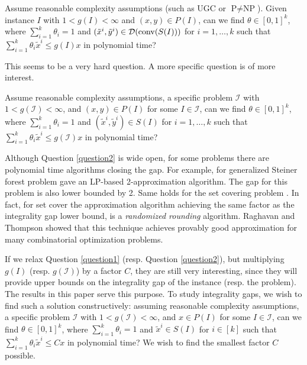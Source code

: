 \begin{question*}\label{question1}
	Assume reasonable complexity assumptions (such as UGC or $\textrm{P}\neq \textrm{NP}$). Given instance $I$ with $1<g(I)<\infty$ and $(x,y)\in P(I)$, can we find $\theta \in [0,1]^k$, where $\sum_{i=1}^{k}\theta_i =1$ and $(\tilde{x}^i,\tilde{y}^i)\in \operatorname{\mathcal{D}}(\operatorname{conv}(S(I)))$ for $i=1,\ldots,k$ such that $\sum_{i=1}^{k}\theta_i \tilde{x}^i\leq g(I)x$ in polynomial time?
\end{question*}

This seems to be a very hard question. A more specific question is of more interest.

\begin{question}\label{question2}
	Assume reasonable complexity assumptions, a specific problem $\mathcal{I}$ with  $1<g({\mathcal{I}})<\infty$, and $(x,y)\in P(I)$ for some $I\in \mathcal{I}$, can we find $\theta \in [0,1]^k$, where $\sum_{i=1}^{k}\theta_i =1$ and $(\tilde{x}^i,\tilde{y}^i)\in S(I)$ for $i=1,\ldots,k$ such that $\sum_{i=1}^{k}\theta_i \tilde{x}^i\leq g(\mathcal{I})x$ in polynomial time?
\end{question}
Although Question \ref{question2} is wide open, for some problems there are polynomial time algorithms closing the gap. For example, for generalized Steiner forest problem \cite{jain} gave an LP-based 2-approximation algorithm. The gap for this problem is also lower bounded by 2. Same holds for the set covering problem \cite{randomizedrounding}. In fact, for set cover the approximation algorithm achieving the same factor as the integrality gap lower bound, is a \textit{randomized rounding} algorithm. Raghavan and Thompson \cite{randomizedrounding} showed that this technique achieves provably good approximation for many combinatorial optimization problems.  

If we relax Question \ref{question1} (resp. Question \ref{question2}), but multiplying $g(I)$ (resp. $g(\mathcal{I})$) by a factor $C$, they are still very interesting, since they will provide upper bounds on the integrality gap of the instance (resp. the problem). The results in this paper serve this purpose.
\fi
To study integrality gaps, we wish to find such a solution constructively: assuming reasonable complexity assumptions, a specific problem $\mathcal{I}$ with  $1<g(\mathcal{I})<\infty$, and $x\in P(I)$ for some $I\in \mathcal{I}$, can we find $\theta \in [0,1]^k$, where $\sum_{i=1}^{k}\theta_i =1$ and $\tilde{x}^i\in S(I)$ for $i\in [k]$ such that $\sum_{i=1}^{k}\theta_i \tilde{x}^i\leq Cx$ in polynomial time? We wish to find the smallest factor $C$ possible.

